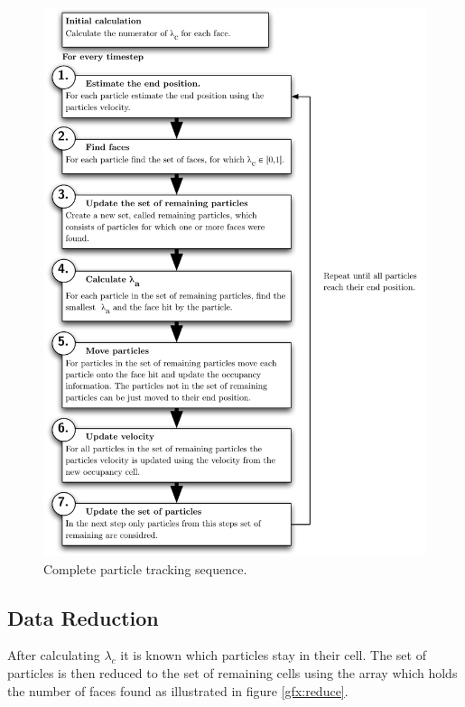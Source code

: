 \begin{figure}[H]
  \centering
  \includegraphics[scale=0.8]{content/gfx/SequenceTracking.pdf}
  \caption{Complete particle tracking sequence.}
  \label{gfx:SequenceTracking}
\end{figure}

\subsection{Data Reduction}

After calculating $\lambda_c$ it is known which particles stay in their cell. The set of particles is then reduced to the set of remaining cells using the array which holds the number of faces found as illustrated in figure \ref{gfx:reduce}.

